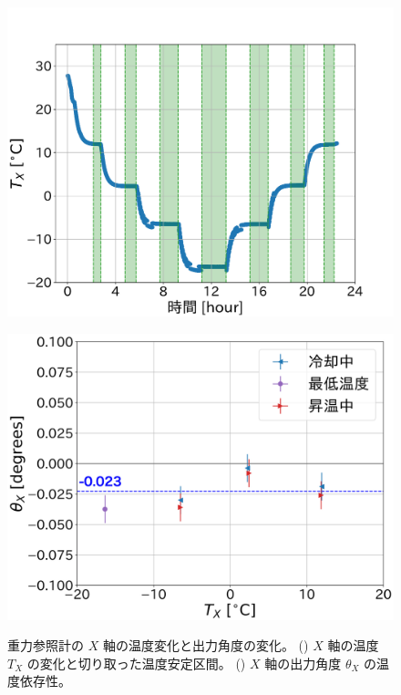 \documentclass[../../main.tex]{subfiles}
\begin{document}
\begin{figure}[H]
    \begin{minipage}[b]{0.45\columnwidth}
        \centering
        \includegraphics[width=1.1\columnwidth]{tiltsensor/bath_tempX.pdf}
        \subcaption{}
        \label{fig:bath_tempX}
    \end{minipage}
    \hspace{0.005\columnwidth}
    \begin{minipage}[b]{0.45\columnwidth}
        \centering
        \includegraphics[width=1.065\columnwidth]{tiltsensor/angleX_temp_dep.pdf}
        \subcaption{}
        \label{fig:angleX_temp_dep}
    \end{minipage}
    \caption{重力参照計の $X$ 軸の温度変化と出力角度の変化。
             () $X$ 軸の温度 $T_{X}$ の変化と切り取った温度安定区間。
             () $X$ 軸の出力角度 $\theta_{X}$ の温度依存性。}
    \label{fig:evaluation_bath_Xaxis}
\end{figure}
\end{document}
